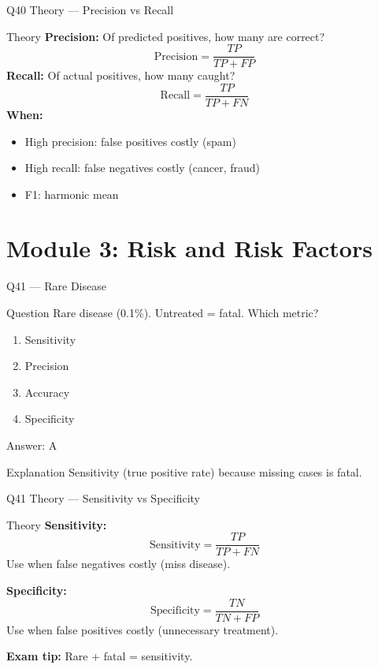 \documentclass[aspectratio=169,8pt]{beamer}
\begin{document}
	\begin{frame}{Q40 Theory --- Precision vs Recall}
		\begin{block}{Theory}
			\textbf{Precision:} Of predicted positives, how many are correct?
			\[
			\text{Precision} = \frac{TP}{TP + FP}
			\]
			\textbf{Recall:} Of actual positives, how many caught?
			\[
			\text{Recall} = \frac{TP}{TP + FN}
			\]
			\textbf{When:}
			\begin{itemize}
				\item High precision: false positives costly (spam)
				\item High recall: false negatives costly (cancer, fraud)
				\item F1: harmonic mean
			\end{itemize}
		\end{block}
	\end{frame}
	
	\section{Module 3: Risk and Risk Factors}
	
	\begin{frame}{Q41 --- Rare Disease}
		\begin{block}{Question}
			Rare disease (0.1\%). Untreated = fatal. Which metric?
		\end{block}
		\begin{enumerate}[label=\Alph*.]
			\item Sensitivity
			\item Precision
			\item Accuracy
			\item Specificity
		\end{enumerate}
		\begin{exampleblock}{Answer: A}
		\end{exampleblock}
		\begin{block}{Explanation}
			Sensitivity (true positive rate) because missing cases is fatal.
		\end{block}
	\end{frame}
	
	\begin{frame}{Q41 Theory --- Sensitivity vs Specificity}
		\begin{block}{Theory}
			\textbf{Sensitivity:}
			\[
			\text{Sensitivity} = \frac{TP}{TP + FN}
			\]
			Use when false negatives costly (miss disease).
			\vspace{2mm}
			
			\textbf{Specificity:}
			\[
			\text{Specificity} = \frac{TN}{TN + FP}
			\]
			Use when false positives costly (unnecessary treatment).
			\vspace{2mm}
			
			\textbf{Exam tip:} Rare + fatal = sensitivity.
		\end{block}
	\end{frame}
	
\end{document}
